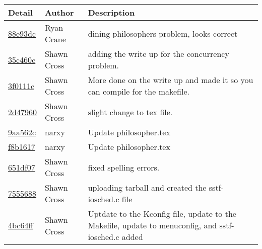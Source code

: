 \begin{tabular}{l l l}\textbf{Detail} & \textbf{Author} & \textbf{Description}\\\hline
\href{https://github.com/crosssh/CS444/commit/88e93dc7f5e10022f61dcc02707ab977045d02f0}{88e93dc} & Ryan Crane & dining philosophers problem, looks correct\\\hline
\href{https://github.com/crosssh/CS444/commit/35c460c5834e37d3b7763cb8cf924fd1c60605aa}{35c460c} & Shawn Cross & adding the write up for the concurrency problem.\\\hline
\href{https://github.com/crosssh/CS444/commit/3f0111c4029242fbff1abdbca709846e312de5e3}{3f0111c} & Shawn Cross & More done on the write up and made it so you can compile for the makefile.\\\hline
\href{https://github.com/crosssh/CS444/commit/2d479602bacb4413c4926dc4d291da1999f4543c}{2d47960} & Shawn Cross & slight change to tex file.\\\hline
\href{https://github.com/crosssh/CS444/commit/9aa562c78ee7ab1d2c149a0a110375449b559d34}{9aa562c} & narxy & Update philosopher.tex\\\hline
\href{https://github.com/crosssh/CS444/commit/f8b1617c75f383036ef25a3ac7a69fd1960cee15}{f8b1617} & narxy & Update philosopher.tex\\\hline
\href{https://github.com/crosssh/CS444/commit/651df07401865b4a7a8b049a5bb170d350407c4d}{651df07} & Shawn Cross & fixed spelling errors.\\\hline
\href{https://github.com/crosssh/CS444/commit/75556889aec755f28b25f1c81b86fb31c7ff825c}{7555688} & Shawn Cross & uploading tarball and created the sstf-iosched.c file\\\hline
\href{https://github.com/crosssh/CS444/commit/4bc64ff20f38125e7a8d84f16e1780b235ff3519}{4bc64ff} & Shawn Cross & Uptdate to the Kconfig file, update to the Makefile, update to menuconfig, and sstf-iosched.c added\\\hline\end{tabular}

